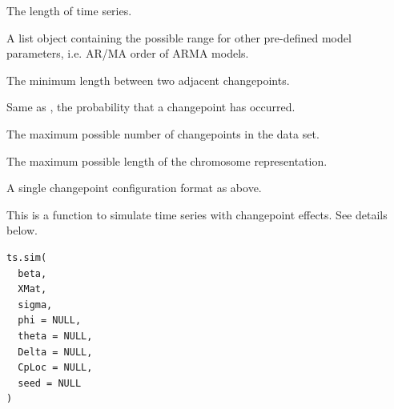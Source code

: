 \documentclass[a4paper]{book}
\begin{document}
%
\begin{Arguments}
\begin{ldescription}
\item[\code{N}] The length of time series.

\item[\code{prange}] A list object containing the possible range for other
pre-defined model parameters, i.e. AR/MA order of ARMA models.

\item[\code{minDist}] The minimum length between two adjacent changepoints.

\item[\code{Pb}] Same as , the probability that a changepoint has occurred.

\item[\code{mmax}] The maximum possible number of changepoints in the data set.

\item[\code{lmax}] The maximum possible length of the chromosome representation.
\end{ldescription}
\end{Arguments}
%
\begin{Value}
A single changepoint configuration format as above.
\end{Value}
%
\begin{Description}
This is a function to simulate time series with changepoint effects. See
details below.
\end{Description}
%
\begin{Usage}
\begin{verbatim}
ts.sim(
  beta,
  XMat,
  sigma,
  phi = NULL,
  theta = NULL,
  Delta = NULL,
  CpLoc = NULL,
  seed = NULL
)
\end{verbatim}
\end{Usage}
%
\end{document}
